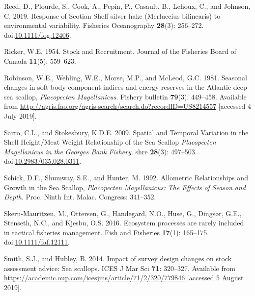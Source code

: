 \documentclass[
]{article}
\newlength{\cslhangindent}
\newlength{\cslentryspacingunit} %
\newenvironment{CSLReferences}[2] %
 {%
  \setlength{\parindent}{0pt}
  \ifodd #1
  \let\oldpar\par
  \def\par{\hangindent=\cslhangindent\oldpar}
  \fi
  \setlength{\parskip}{#2\cslentryspacingunit}
 }%
 {}
\begin{document}
\begin{CSLReferences}{1}{0}
\leavevmode{}%
Reed, D., Plourde, S., Cook, A., Pepin, P., Casault, B., Lehoux, C., and Johnson, C. 2019. Response of {Scotian Shelf} silver hake ({Merluccius} bilinearis) to environmental variability. Fisheries Oceanography \textbf{28}(3): 256--272. doi:\href{https://doi.org/10.1111/fog.12406}{10.1111/fog.12406}.

\leavevmode{}%
Ricker, W.E. 1954. Stock and {Recruitment}. Journal of the Fisheries Board of Canada \textbf{11}(5): 559--623.

\leavevmode{}%
Robinson, W.E., Wehling, W.E., Morse, M.P., and McLeod, G.C. 1981. Seasonal changes in soft-body component indices and energy reserves in the {Atlantic} deep-sea scallop, {\emph{Placopecten}}{ \emph{Magellanicus}}{\emph{\emph{}}}. Fishery bulletin \textbf{79}(3): 449--458. Available from \url{http://agris.fao.org/agris-search/search.do?recordID=US8214557} {[}accessed 4 July 2019{]}.

\leavevmode{}%
Sarro, C.L., and Stokesbury, K.D.E. 2009. Spatial and {Temporal Variation} in the {Shell Height}/{Meat Weight Relationship} of the {Sea Scallop} {\emph{Placopecten}}{ \emph{Magellanicus}}{ \emph{\emph{in the}} }{\emph{\emph{Georges Bank Fishery}}}. shre \textbf{28}(3): 497--503. doi:\href{https://doi.org/10.2983/035.028.0311}{10.2983/035.028.0311}.

\leavevmode{}%
Schick, D.F., Shumway, S.E., and Hunter, M. 1992. Allometric {Relationships} and {Growth} in the {Sea Scallop}, {\emph{Placopecten}}{ \emph{Magellanicus}}{\emph{\emph{:}} }{\emph{\emph{The Effects}}}{ \emph{\emph{of}} }{\emph{\emph{Season}}}{ \emph{\emph{and}} }{\emph{\emph{Depth}}}. Proc. Ninth Int. Malac. Congress: 341--352.

\leavevmode{}%
Skern‐Mauritzen, M., Ottersen, G., Handegard, N.O., Huse, G., Dingsør, G.E., Stenseth, N.C., and Kjesbu, O.S. 2016. Ecosystem processes are rarely included in tactical fisheries management. Fish and Fisheries \textbf{17}(1): 165--175. doi:\href{https://doi.org/10.1111/faf.12111}{10.1111/faf.12111}.

\leavevmode{}%
Smith, S.J., and Hubley, B. 2014. Impact of survey design changes on stock assessment advice: Sea scallops. ICES J Mar Sci \textbf{71}: 320--327. Available from \url{https://academic.oup.com/icesjms/article/71/2/320/779846} {[}accessed 5 August 2019{]}.


\end{CSLReferences}
\end{document}
